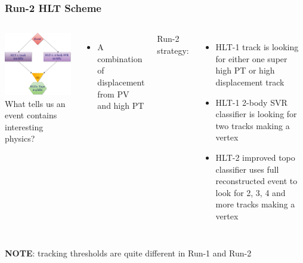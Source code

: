 \documentclass[xcolor=svgnames]{beamer}
\begin{document}
\begin{frame}\frametitle{Run-2 HLT Scheme}
\begin{columns}
\column{2in}
\hspace*{0.1cm} \includegraphics[width=1.9in]{images/sheme.png}
\column{2.8in}
What tells us an event contains interesting physics?

\begin{itemize}
\item A combination of displacement from PV and high PT
\end{itemize}

Run-2 strategy:
\begin{itemize}
\item HLT-1 track is looking for either one super high PT or high displacement track
\item HLT-1 2-body SVR classifier is looking for two tracks making a vertex 
\item HLT-2 improved topo classifier uses full reconstructed event to look for 2, 3, 4 and more tracks making a vertex

\end{itemize}

\end{columns}
\vspace*{0.5cm}

{\bf NOTE}: tracking thresholds are quite different in Run-1 and Run-2
\end{frame}
\end{document}

